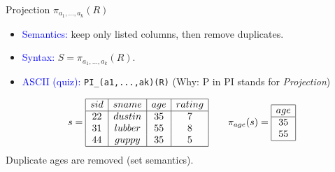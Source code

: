 \documentclass[10pt,aspectratio=169]{beamer}
\newcommand{\proj}{\pi}
\begin{document}
\begin{frame}{Projection \(\proj_{a_1,\dots,a_k}(R)\)}
\begin{itemize}
  \item \textcolor{blue}{Semantics:} keep only listed columns, then remove duplicates.
  \item \textcolor{blue}{Syntax:} \(S = \proj_{a_1,\dots,a_k}(R)\).
  \item \textcolor{blue}{ASCII (quiz):} \texttt{PI\_(a1,...,ak)(R)}    (Why: P in PI stands for \textit{Projection})
\end{itemize}

\vspace{0.4em}
\small
\[
s=\begin{array}{|c|c|c|c|}\hline
sid&sname&age&rating\\\hline
22&dustin&35&7\\
31&lubber&55&8\\
44&guppy&35&5\\\hline
\end{array}
\qquad
\proj_{age}(s)=
\begin{array}{|c|}\hline
age\\\hline
35\\
55\\\hline
\end{array}
\]
\small Duplicate ages are removed (set semantics).
\end{frame}
\end{document}

